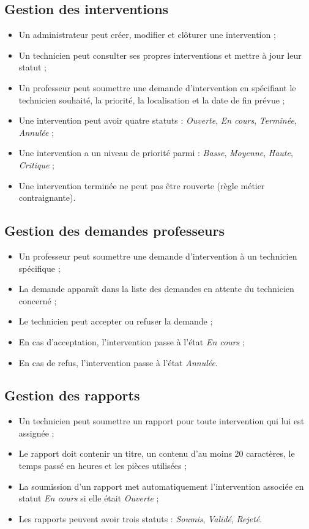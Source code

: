 \documentclass[12pt,a4paper,oneside]{report}
\begin{document}
\subsection{Gestion des interventions}

\begin{itemize}[leftmargin=2em]
  \item Un administrateur peut créer, modifier et clôturer une intervention ;
  \item Un technicien peut consulter ses propres interventions et mettre à jour leur statut ;
  \item Un professeur peut soumettre une demande d'intervention en spécifiant le technicien souhaité, la priorité, la localisation et la date de fin prévue ;
  \item Une intervention peut avoir quatre statuts : \textit{Ouverte}, \textit{En cours}, \textit{Terminée}, \textit{Annulée} ;
  \item Une intervention a un niveau de priorité parmi : \textit{Basse}, \textit{Moyenne}, \textit{Haute}, \textit{Critique} ;
  \item Une intervention terminée ne peut pas être rouverte (règle métier contraignante).
\end{itemize}

\subsection{Gestion des demandes professeurs}

\begin{itemize}[leftmargin=2em]
  \item Un professeur peut soumettre une demande d'intervention à un technicien spécifique ;
  \item La demande apparaît dans la liste des demandes en attente du technicien concerné ;
  \item Le technicien peut accepter ou refuser la demande ;
  \item En cas d'acceptation, l'intervention passe à l'état \textit{En cours} ;
  \item En cas de refus, l'intervention passe à l'état \textit{Annulée}.
\end{itemize}

\subsection{Gestion des rapports}

\begin{itemize}[leftmargin=2em]
  \item Un technicien peut soumettre un rapport pour toute intervention qui lui est assignée ;
  \item Le rapport doit contenir un titre, un contenu d'au moins 20 caractères, le temps passé en heures et les pièces utilisées ;
  \item La soumission d'un rapport met automatiquement l'intervention associée en statut \textit{En cours} si elle était \textit{Ouverte} ;
  \item Les rapports peuvent avoir trois statuts : \textit{Soumis}, \textit{Validé}, \textit{Rejeté}.
\end{itemize}
\end{document}
